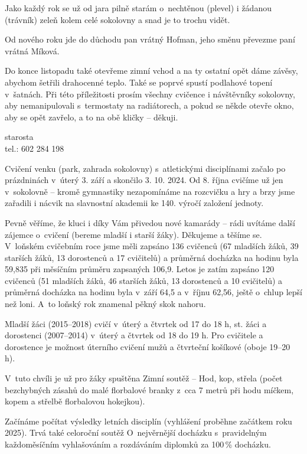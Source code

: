 \documentclass[11pt]{article}
\begin{document}
Jako každý rok se už od jara pilně starám o~nechtěnou (plevel) i žádanou (trávník) zeleň kolem celé sokolovny a snad je to trochu vidět.

Od nového roku jde do důchodu pan vrátný Hofman, jeho směnu převezme paní vrátná Míková.

Do konce listopadu také otevřeme zimní vchod a na ty ostatní opět dáme závěsy, abychom šetřili drahocenné teplo. Také se poprvé spustí podlahové topení v~šatnách. Při této příležitosti prosím všechny cvičence i návštěvníky sokolovny, aby nemanipulovali s~termostaty na radiátorech, a pokud se někde otevře okno, aby se opět zavřelo, a to na obě kličky – děkuji.

\signature{Jiří Novák (Jirkan)}{starosta\\tel.: 602 284 198}



Cvičení venku (park, zahrada sokolovny) s~atletickými disciplínami začalo po prázdninách v~úterý 3. září a skončilo 3. 10. 2024. Od 8. října cvičíme už jen v~sokolovně – kromě gymnastiky nezapomínáme na rozcvičku a hry a brzy jsme zařadili i nácvik na slavnostní akademii ke 140. výročí založení jednoty.

Pevně věříme, že kluci i díky Vám přivedou nové kamarády – rádi uvítáme další zájemce o~cvičení (bereme mladší i starší žáky). Děkujeme a těšíme se. V~loňském cvičebním roce jsme měli zapsáno 136 cvičenců (67 mladších žáků, 39 starších žáků, 13 dorostenců a 17 cvičitelů) a průměrná docházka na hodinu byla 59,835 při měsíčním průměru zapsaných 106,9. Letos je zatím zapsáno 120 cvičenců (51 mladších žáků, 46 starších žáků, 13 dorostenců a 10 cvičitelů) a průměrná docházka na hodinu byla v~září 64,5 a v~říjnu 62,56, ještě o~chlup lepší než loni. A~to loňský rok znamenal pěkný skok nahoru.

Mladší žáci (2015–2018) cvičí v~úterý a čtvrtek od 17 do 18 h, st. žáci a dorostenci (2007–2014) v~úterý a čtvrtek od 18 do 19 h. Pro cvičitele a dorostence je možnost úterního cvičení mužů a čtvrteční košíkové (oboje 19–20 h). 

V~tuto chvíli je už pro žáky spuštěna Zimní soutěž – Hod, kop, střela (počet bezchybných zásahů do malé florbalové branky z~cca 7 metrů při hodu míčkem, kopem a střelbě florbalovou hokejkou). 

Začínáme počítat výsledky letních disciplín (vyhlášení proběhne začátkem roku 2025). Trvá také celoroční soutěž O~nejvěrnější docházku s~pravidelným každoměsíčním vyhlašováním a rozdáváním diplomků za 100\,\% docházku. 
\end{document}
